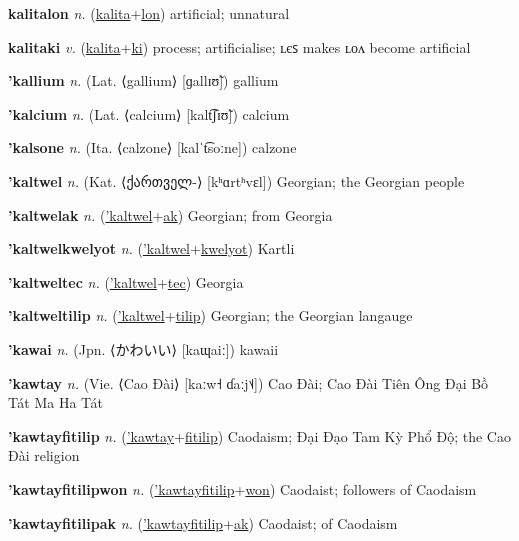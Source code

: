 \textbf{\hypertarget{kalitalon}{kalitalon}} \textit{n.} (\hyperlink{kalita}{kalita}+\allowbreak \hyperlink{lon}{lon})
artificial; unnatural

\textbf{\hypertarget{kalitaki}{kalitaki}} \textit{v.} (\hyperlink{kalita}{kalita}+\allowbreak \hyperlink{ki}{ki})
process; artificialise; ʟєꜱ makes ʟᴏᴧ become artificial

\textbf{\hypertarget{'kallium}{'kallium}} \textit{n.} (Lat. ⟨gallium⟩ [ɡallɪʊ̃])
gallium

\textbf{\hypertarget{'kalcium}{'kalcium}} \textit{n.} (Lat. ⟨calcium⟩ [kalt͡ʃɪʊ̃])
calcium

\textbf{\hypertarget{'kalsone}{'kalsone}} \textit{n.} (Ita. ⟨calzone⟩ [kalˈt͡soːne])
calzone

\textbf{\hypertarget{'kaltwel}{'kaltwel}} \textit{n.} (Kat. ⟨{\georgian{}ქართველ-}⟩ [kʰɑrtʰvɛl])
Georgian; the Georgian people

\textbf{\hypertarget{'kaltwelak}{'kaltwelak}} \textit{n.} (\hyperlink{'kaltwel}{'kaltwel}+\allowbreak \hyperlink{ak}{ak})
Georgian; from Georgia

\textbf{\hypertarget{'kaltwelkwelyot}{'kaltwelkwelyot}} \textit{n.} (\hyperlink{'kaltwel}{'kaltwel}+\allowbreak \hyperlink{kwelyot}{kwelyot})
Kartli

\textbf{\hypertarget{'kaltweltec}{'kaltweltec}} \textit{n.} (\hyperlink{'kaltwel}{'kaltwel}+\allowbreak \hyperlink{tec}{tec})
Georgia

\textbf{\hypertarget{'kaltweltilip}{'kaltweltilip}} \textit{n.} (\hyperlink{'kaltwel}{'kaltwel}+\allowbreak \hyperlink{tilip}{tilip})
Georgian; the Georgian langauge

\textbf{\hypertarget{'kawai}{'kawai}} \textit{n.} (Jpn. ⟨{\japanese{}かわいい}⟩ [kaɰaiː])
kawaii

\textbf{\hypertarget{'kawtay}{'kawtay}} \textit{n.} (Vie. ⟨Cao Đài⟩ [kaːw˧ ɗaːj˦˨])
Cao Đài; Cao Đài Tiên Ông Đại Bồ Tát Ma Ha Tát

\textbf{\hypertarget{'kawtayfitilip}{'kawtayfitilip}} \textit{n.} (\hyperlink{'kawtay}{'kawtay}+\allowbreak \hyperlink{fitilip}{fitilip})
Caodaism; Đại Đạo Tam Kỳ Phổ Độ; the Cao Đài religion

\textbf{\hypertarget{'kawtayfitilipwon}{'kawtayfitilipwon}} \textit{n.} (\hyperlink{'kawtayfitilip}{'kawtayfitilip}+\allowbreak \hyperlink{won}{won})
Caodaist; followers of Caodaism

\textbf{\hypertarget{'kawtayfitilipak}{'kawtayfitilipak}} \textit{n.} (\hyperlink{'kawtayfitilip}{'kawtayfitilip}+\allowbreak \hyperlink{ak}{ak})
Caodaist; of Caodaism

